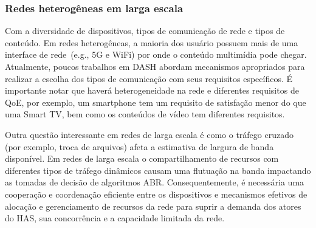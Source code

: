 \subsubsection{Redes heterogêneas em larga escala}
\label{subsec:mobility}

Com a diversidade de dispositivos, tipos de comunicação de rede e tipos de conteúdo. Em redes heterogêneas, a maioria dos usuário possuem mais de uma interface de rede~(e.g., 5G e WiFi) por onde o conteúdo multimídia pode chegar. Atualmente, poucos trabalhos em DASH abordam mecanismos apropriados para realizar a escolha dos tipos de comunicação com seus requisitos específicos.
É importante notar que haverá heterogeneidade na rede e diferentes requisitos de QoE, por exemplo, um smartphone tem um requisito de satisfação menor do que uma Smart TV, bem como os conteúdos de vídeo tem diferentes requisitos.


Outra questão interessante em redes de larga escala é como o tráfego cruzado (por exemplo, troca de arquivos) afeta a estimativa de largura de banda disponível. Em redes de larga escala o compartilhamento de recursos com diferentes tipos de tráfego dinâmicos causam uma flutuação na banda impactando as tomadas de decisão de algoritmos ABR.
Consequentemente, é necessária uma cooperação e coordenação eficiente entre os dispositivos e mecanismos efetivos de alocação e gerenciamento de recursos da rede para suprir a demanda dos atores do HAS, sua concorrência e a capacidade limitada da rede.





